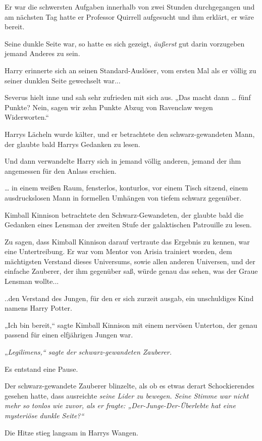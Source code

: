 {Er war die schwersten Aufgaben innerhalb von zwei Stunden durchgegangen und am nächsten Tag hatte er Professor Quirrell aufgesucht und ihm erklärt, er wäre bereit.

Seine dunkle Seite war, so hatte es sich gezeigt, \emph{äußerst} gut darin vorzugeben jemand Anderes zu sein.

Harry erinnerte sich an seinen Standard-Auslöser, vom ersten Mal als er völlig zu seiner dunklen Seite gewechselt war...

Severus hielt inne und sah sehr zufrieden mit sich aus. „Das macht dann … fünf Punkte? Nein, sagen wir zehn Punkte Abzug von Ravenclaw wegen Widerworten.“

Harrys Lächeln wurde kälter, und er betrachtete den schwarz-gewandeten Mann, der glaubte bald Harrys Gedanken zu lesen.

Und dann verwandelte Harry sich in jemand völlig anderen, jemand der ihm angemessen für den Anlass erschien.

… in einem weißen Raum, fensterlos, konturlos, vor einem Tisch sitzend, einem ausdruckslosen Mann in formellen Umhängen von tiefem schwarz gegenüber.

Kimball Kinnison betrachtete den Schwarz-Gewandeten, der glaubte bald die Gedanken eines Lensman der zweiten Stufe der galaktischen Patrouille zu lesen.

Zu sagen, dass Kimball Kinnison darauf vertraute das Ergebnis zu kennen, war eine Untertreibung. Er war vom Mentor von Arisia trainiert worden, dem mächtigsten Verstand dieses Universums, sowie allen anderen Universen, und der einfache Zauberer, der ihm gegenüber saß, würde genau das sehen, was der Graue Lensman wollte...

..den Verstand des Jungen, für den er sich zurzeit ausgab, ein unschuldiges Kind namens Harry Potter.

„Ich bin bereit,“ sagte Kimball Kinnison mit einem nervösen Unterton, der genau passend für einen elfjährigen Jungen war.

„\emph{Legilimens,“ sagte der schwarz-gewandeten Zauberer.}

Es entstand eine Pause.

Der schwarz-gewandete Zauberer blinzelte, als ob es etwas derart Schockierendes gesehen hatte, dass ausreichte \emph{seine Lider zu bewegen. Seine Stimme war nicht mehr so tonlos wie zuvor, als er fragte: „Der-Junge-Der-Überlebte hat \emph{eine mysteriöse dunkle Seite?“}}

Die Hitze stieg langsam in Harrys Wangen.

}
